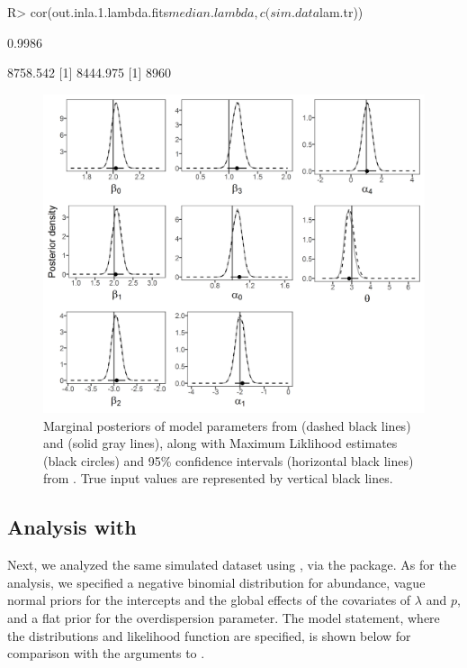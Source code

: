 \documentclass[codesnippet]{jss}
\begin{document}
\begin{CodeInput}
R> cor(out.inla.1.lambda.fits$median.lambda, c(sim.data$lam.tr))
\end{CodeInput}
\begin{CodeOutput}
[1] 0.9986
\end{CodeOutput}

\begin{CodeOutput}
[1] 8758.542
[1] 8444.975
[1] 8960
\end{CodeOutput}

\begin{figure}[p]
\includegraphics[width=\linewidth]{fig1.png}
\caption{Marginal posteriors of model parameters from  (dashed black lines) and  (solid gray lines), along with Maximum Liklihood estimates (black circles) and 95\% confidence intervals (horizontal black lines) from .  True input values are represented by vertical black lines.}
\label{fig:fig1}
\end{figure}

\subsection[Analysis with JAGS]{Analysis with }
Next, we analyzed the same simulated dataset using , via the  package. As for the  analysis, we specified a negative binomial distribution for abundance, vague normal priors for the intercepts and the global effects of the covariates of $\lambda$ and $p$, and a flat prior for the overdispersion parameter.  The  model statement, where the distributions and likelihood function are specified, is shown below for comparison with the arguments to .
\end{document}
